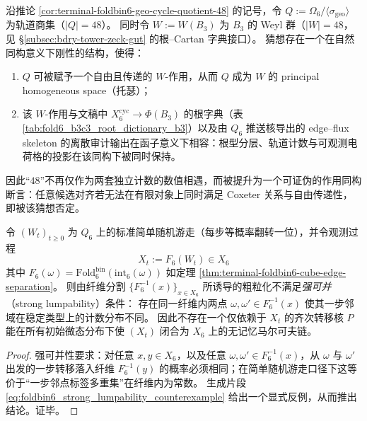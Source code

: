 \begin{conjecture}\label{conj:terminal-window6-weyl-orbit-torsor}
沿推论 \ref{cor:terminal-foldbin6-geo-cycle-quotient-48} 的记号，令
\(
Q:=\Omega_6/\langle\sigma_{\mathrm{geo}}\rangle
\)
为轨道商集（\(|Q|=48\)）。
同时令 \(W:=W(B_3)\) 为 \(B_3\) 的 Weyl 群（\(|W|=48\)，见 \S\ref{subsec:bdry-tower-zeck-gut} 的根--Cartan 字典接口）。
猜想存在一个在自然同构意义下刚性的结构，使得：
\begin{enumerate}
  \item \(Q\) 可被赋予一个自由且传递的 \(W\)-作用，从而 \(Q\) 成为 \(W\) 的 principal homogeneous space（托瑟）；
  \item 该 \(W\)-作用与文稿中 \(X_6^{\mathrm{cyc}}\to \Phi(B_3)\) 的根字典（表 \ref{tab:fold6_b3c3_root_dictionary_b3}）以及由 \(Q_6\) 推送核导出的 edge--flux skeleton 的离散审计输出在函子意义下相容：根型分层、轨道计数与可观测电荷格的投影在该同构下被同时保持。
\end{enumerate}
因此“\(48\)”不再仅作为两套独立计数的数值相遇，而被提升为一个可证伪的作用同构断言：任意候选对齐若无法在有限对象上同时满足 Coxeter 关系与自由传递性，即被该猜想否定。
\end{conjecture}

\begin{proposition}\label{prop:terminal-foldbin6-strong-lumpability-fails}
令 \((W_t)_{t\ge 0}\) 为 \(Q_6\) 上的标准简单随机游走（每步等概率翻转一位），并令观测过程
\[
X_t:=F_6(W_t)\in X_6
\]
其中 \(F_6(\omega)=\mathrm{Fold}^{\mathrm{bin}}_6(\mathrm{int}_6(\omega))\) 如定理 \ref{thm:terminal-foldbin6-cube-edge-separation}。
则由纤维分割 \(\{F_6^{-1}(x)\}_{x\in X_6}\) 所诱导的粗粒化不满足\emph{强可并}（strong lumpability）条件：
存在同一纤维内两点 \(\omega,\omega'\in F_6^{-1}(x)\) 使其一步邻域在稳定类型上的计数分布不同。
因此不存在一个仅依赖于 \(X_t\) 的齐次转移核 \(P\) 能在所有初始微态分布下使 \((X_t)\) 闭合为 \(X_6\) 上的无记忆马尔可夫链。
\end{proposition}
\begin{proof}
强可并性要求：对任意 \(x,y\in X_6\)，以及任意 \(\omega,\omega'\in F_6^{-1}(x)\)，从 \(\omega\) 与 \(\omega'\) 出发的一步转移落入纤维 \(F_6^{-1}(y)\) 的概率必须相同；在简单随机游走口径下这等价于“一步邻点标签多重集”在纤维内为常数。
生成片段 \eqref{eq:foldbin6_strong_lumpability_counterexample} 给出一个显式反例，从而推出结论。证毕。
\end{proof}

